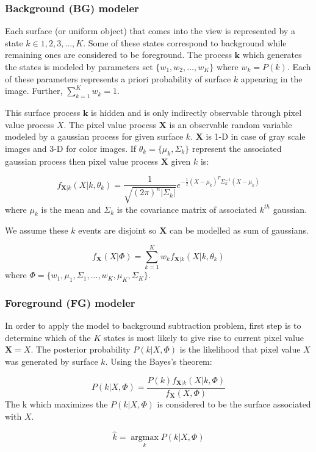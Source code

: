 \subsubsection{Background (BG) modeler}
Each surface (or uniform object) that comes into the view is represented by a state $k \in {1,2,3,...,K}$. Some of these states correspond to  background while remaining ones are considered to be foreground. The process  $\mathbf{k}$ which generates the states is modeled by parameters set $\{w_1, w_2, ..., w_K\}$ where $w_k = P(k)$. Each of these parameters represents  a priori probability of surface $k$ appearing in the image. Further, $\sum_{k=1}^K w_k=1$. 

This surface process $\mathbf{k}$ is hidden and is only indirectly observable through pixel value process $X$. The pixel value process $\mathbf{X}$ is an observable random variable modeled by a gaussian process for given surface $k$. $\mathbf{X}$ is 1-D in case of gray scale images and 3-D for color images.  If $\theta_k= \{\mu_k, \Sigma_k \}$  represent the associated gaussian process then pixel value process $\mathbf{X}$ given $k$ is: 

$$ f_{\mathbf{X}|k}(X|k,\theta_k)=\frac{1}{\sqrt{(2\pi)^n |\Sigma_k |}}e^{-\frac{1}{2}(X-\mu_k)^T \Sigma_k^{-1} (X-\mu_k)} $$
where $\mu_k$ is the mean and $\Sigma_k$ is the covariance matrix of associated $k^{th}$ gaussian. 

We assume these $k$ events are disjoint so $\mathbf{X}$ can be modelled as sum of gaussians. 

$$ f_{\mathbf{X}}(X|\Phi)=\sum_{k=1}^K w_k f_{\mathbf{X}|k}(X|k,\theta_k)  $$
where $ \Phi = \{w_1, \mu_1, \Sigma_1,..., w_K, \mu_K, \Sigma_K \}$. 

\subsubsection{Foreground (FG) modeler}
In order to apply the model to background subtraction problem, first step is to determine which of the $K$ states is most likely to give rise to current pixel value $\mathbf{X}=X$. The posterior probability $P(k|X,\Phi)$ is the likelihood that pixel value $X$ was generated by surface $k$. Using the Bayes's theorem:

$$ P(k|X,\Phi) = \frac{P(k)f_{\mathbf{X}|k}(X|k,\Phi)}{f_\mathbf{X}(X,\Phi)} $$
The k which maximizes the $P(k|X,\Phi) $ is considered to be the surface associated with $X$.

$$ \hat{k}=\operatorname*{argmax}_k P(k|X,\Phi)$$

